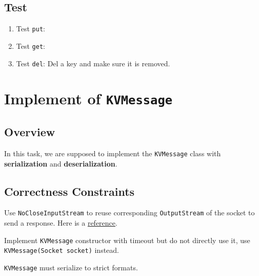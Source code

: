 \documentclass{article}
\begin{document}
\subsection{Test}
\begin{enumerate}
	\item Test \texttt{put}:
	\item Test \texttt{get}:
	\item Test \texttt{del}: Del a key and make sure it is removed.
\end{enumerate}

\section{Implement of \texttt{KVMessage}}
\subsection{Overview}
In this task, we are supposed to implement the \texttt{KVMessage} class with \textbf{serialization} and \textbf{deserialization}.

\subsection{Correctness Constraints}
\begin{compactitem}
	\item Use \texttt{NoCloseInputStream} to reuse corresponding \texttt{OutputStream} of the socket to send a response.
		Here is a \href{https://weblogs.java.net/blog/kohsuke/archive/2005/07/socket_xml_pitf.html}{reference}.
	\item Implement \texttt{KVMessage} constructor with timeout but do not directly use it, use \texttt{KVMessage(Socket socket)} instead.
	\item \texttt{KVMessage} must serialize to strict formats.
\end{compactitem}
\end{document}
